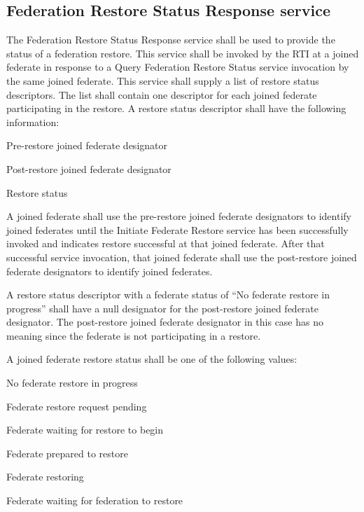 \begin{compactstdpage}
    \subsection{Federation Restore Status Response \rtiinitiated{} service}

    The Federation Restore Status Response \rtiinitiated{} service shall be used to provide the status of a federation restore. This service shall be invoked by the RTI at a joined federate in response to a Query Federation Restore Status service invocation by the same joined federate. This service shall supply a list of restore status descriptors. The list shall contain one descriptor for each joined federate participating in the restore. A restore status descriptor shall have the following information:

    \begin{stddashlist}
        \item Pre-restore joined federate designator
        \item Post-restore joined federate designator
        \item Restore status
    \end{stddashlist}

    A joined federate shall use the pre-restore joined federate designators to identify joined federates until the Initiate Federate Restore \rtiinitiated{} service has been successfully invoked and indicates restore successful at that joined federate. After that successful service invocation, that joined federate shall use the post-restore joined federate designators to identify joined federates.

    A restore status descriptor with a federate status of ``No federate restore in progress'' shall have a null designator for the post-restore joined federate designator. The post-restore joined federate designator in this case has no meaning since the federate is not participating in a restore.

    A joined federate restore status shall be one of the following values:

    \begin{stddashlist}
        \item No federate restore in progress
        \item Federate restore request pending
        \item Federate waiting for restore to begin
        \item Federate prepared to restore
        \item Federate restoring
        \item Federate waiting for federation to restore
    \end{stddashlist}


\end{compactstdpage}
